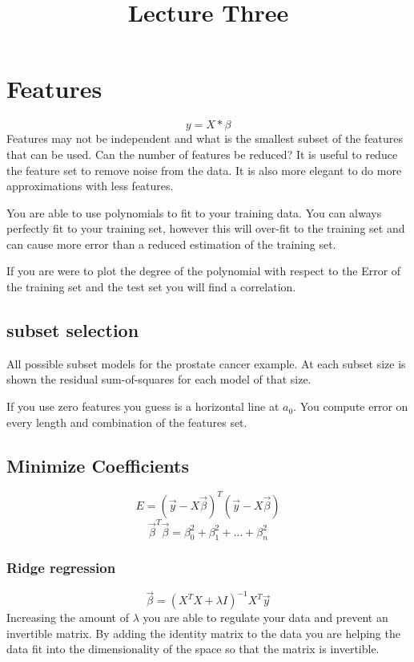 \documentclass[letter, 9pt]{article}
\title{Lecture Three}
\begin{document}
\maketitle

\section{Features}
\begin{equation}
y = X * \beta
\end{equation}
Features may not be independent and what is the smallest subset of the features that can be used. Can the number of features be reduced? It is useful to reduce the feature set to remove noise from the data. It is also more elegant to do more approximations with less features.

You are able to use polynomials to fit to your training data. You can always perfectly fit to your training set, however this will over-fit to the training set and can cause more error than a reduced estimation of the training set.

If you are were to plot the degree of the polynomial with respect to the Error of the training set and the test set you will find a correlation.

\subsection{subset selection}
All possible subset models for the prostate cancer example. At each subset size is shown the residual sum-of-squares for each model of that size.

If you use zero features you guess is a horizontal line at $a_0$. You compute error on every length and combination of the features set.

\subsection{Minimize Coefficients}
\begin{equation}
E = (\vec{y} - X\vec{\beta})^T(\vec{y} - X\vec{\beta})
\end{equation}
\begin{equation}
\vec{\beta}^T \vec{\beta} = \beta_0^2 + \beta_1^2 + \dots + \beta_n^2
\end{equation}

\subsubsection{Ridge regression}
\begin{equation}
\vec{\beta} = (X^TX + \lambda I)^{-1} X^T \vec{y}
\end{equation}
Increasing the amount of $\lambda$ you are able to regulate your data and prevent an invertible matrix. By adding the identity matrix to the data you are helping the data fit into the dimensionality of the space so that the matrix is invertible.
\end{document}
